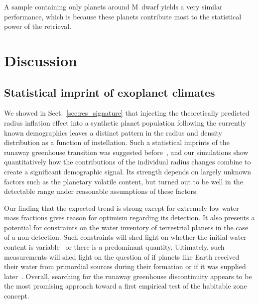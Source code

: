 \documentclass[twocolumn,twocolappendix]{aastex631}
\begin{document}
A sample containing only planets around M~dwarf yields a very similar performance, which is because these planets contribute most to the statistical power of the retrieval.



\section{Discussion}\label{sec:discussion}

\subsection{Statistical imprint of exoplanet climates}
We showed in Sect.~\ref{sec:res_signature} that injecting the theoretically predicted radius inflation effect into a synthetic planet population following the currently known demographics leaves a distinct pattern in the radius and density distribution as a function of instellation.
Such a statistical imprints of the runaway greenhouse transition was suggested before~\citep{Turbet2019}, and our simulations show quantitatively how the contributions of the individual radius changes combine to create a significant demographic signal.
Its strength depends on largely unknown factors such as the planetary volatile content, but turned out to be well in the detectable range under reasonable assumptions of these factors.

Our finding that the expected trend is strong except for extremely low water mass fractions gives reason for optimism regarding its detection.
It also presents a potential for constraints on the water inventory of terrestrial planets in the case of a non-detection.
Such constraints will shed light on whether the initial water content is variable~\citep{Lichtenberg2019} or there is a predominant quantity.
Ultimately, such measurements will shed light on the question of if planets like Earth received their water from primordial sources during their formation or if it was supplied later~\citep[e.g.,][]{Raymond2004}.
Overall, searching for the runaway greenhouse discontinuity appears to be the most promising approach toward a first empirical test of the habitable zone concept.
\end{document}
